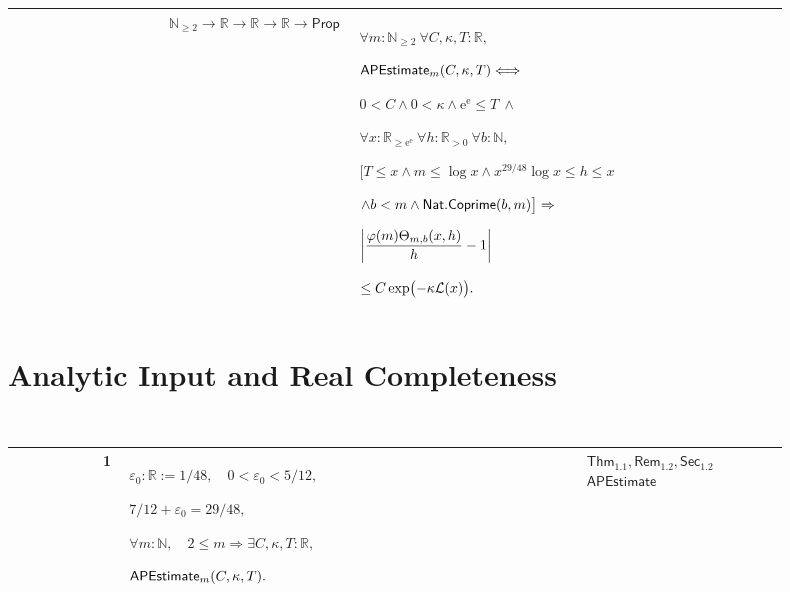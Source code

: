 \documentclass[12pt,reqno]{amsart}
\theoremstyle{blueplain}
\numberwithin{equation}{section}
\begin{document}
{\scriptsize \setlength{\parskip}{0pt}\nointerlineskip
\noindent 
\begin{tabular}{|@{}>{\centering\arraybackslash}m{0.19251\linewidth}|>{\centering\arraybackslash}m{0.16845\linewidth}|>{\centering\arraybackslash}m{0.53904\linewidth}|}
\hline
{\hypertarget{def:APEstimate}{$\mathsf{APEstimate}$}} & {$\mathbb{N}%
_{\ge2}\to\mathbb{R}\to\mathbb{R}\to\mathbb{R}\to\mathsf{Prop}$} & {$%
\displaystyle \forall m:\mathbb{N}_{\ge2}\ \forall C,\kappa,T:\mathbb{R},$ %
\par$\displaystyle \hyperlink{def:APEstimate}{\mathsf{APEstimate} }%
_m(C,\kappa,T)\Longleftrightarrow$ \par$\displaystyle 0<C\wedge0<\kappa\wedge%
\mathrm{e}^{\mathrm{e}}\le T\ \wedge$ \par$\displaystyle \forall x:\mathbb{R}%
_{\ge\mathrm{e}^{\mathrm{e}}}\ \forall h:\mathbb{R}_{>0}\ \forall b:\mathbb{N%
},$ \par$\displaystyle \bigl[T\le x\wedge m\le\log x\wedge x^{29/48}\log
x\le h\le x$ \par$\displaystyle \wedge b<m\wedge \hyperlink{def:Nat.Coprime}{%
\mathsf{Nat.Coprime} }(b,m)\bigr]\Rightarrow$ \par$\displaystyle \left|\frac{%
\hyperlink{def:Totient}{\varphi(m)}\hyperlink{def:Theta}{\Theta_{m,b}(x,h)}}%
h-1\right|$ \par$\displaystyle \le C\exp\bigl(-\kappa \hyperlink{def:LogScale}%
{\mathcal{L}(x)}\bigr).$} \\ \hline
\end{tabular}
}

\section{Analytic Input and Real Completeness}

\label{sec:axioms} {\ }

{\scriptsize \setlength{\parskip}{0pt}\nointerlineskip
\noindent 
\begin{tabular}{|@{}>{\centering\arraybackslash}m{0.10658\linewidth}|>{\centering\arraybackslash}m{0.03553\linewidth}|>{\centering\arraybackslash}m{0.52105\linewidth}|>{\centering\arraybackslash}m{0.23684\linewidth}|}
\hline
{\hypertarget{row:S1}{$\mathsf{S}$}} & {1} & {$\displaystyle \varepsilon_0:%
\mathbb{R}:=1/48,\quad0<\varepsilon_0<5/12,$ \par$\displaystyle %
7/12+\varepsilon_0=29/48,$ \par$\displaystyle \forall m:\mathbb{N},\quad2\le
m\Rightarrow\exists C,\kappa,T:\mathbb{R},$ \par$\displaystyle \hyperlink{def:APEstimate}%
{\mathsf{APEstimate} }_m(C,\kappa,T).$} & {\cite{ThornerZaman2024} 
\hyperlink{abbr-source:ThornerZaman2024}{$\mathsf{Thm}_{1.1},\mathsf{Rem}%
_{1.2},\mathsf{Sec}_{1.2}$} \hyperlink{def:APEstimate}{$\mathsf{APEstimate}$}%
} \\ \hline
\end{tabular}%
}
\end{document}
